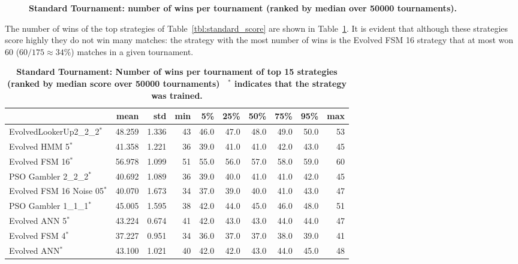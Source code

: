 \documentclass[10pt,letterpaper]{article}
\begin{document}
\begin{figure}[!hbtp]
    \centering
    \caption{\bf Standard Tournament: number of wins per tournament (ranked by
    median over
    50000 tournaments).}
    \label{fig:standard_winplot}
\end{figure}

The number of wins of the top strategies of Table~\ref{tbl:standard_score} are
shown in Table~\ref{tbl:standard_wins}. It is evident that although these
strategies score highly they do not win many matches: the strategy with the most
number of wins is the Evolved FSM 16 strategy that at most won 60
(\(60/175\approx34\%\)) matches in a given tournament.

\begin{table}[!hbtp]
    \caption{\bf Standard Tournament: Number of wins per tournament
        of top 15 strategies (ranked by median score over
        50000 tournaments)
        ~$^{*}$ indicates that the strategy was trained.}
        \label{tbl:standard_wins}
    \centering
    \footnotesize
\begin{tabular}{lrrrrrrrrr}
\toprule
{} &    mean &    std &  min &    5\% &   25\% &   50\% &   75\% &   95\% &  max \\
\midrule
EvolvedLookerUp2\_2\_2$^{*}$    &  48.259 &  1.336 &   43 &  46.0 &  47.0 &  48.0 &  49.0 &  50.0 &   53 \\
Evolved HMM 5$^{*}$           &  41.358 &  1.221 &   36 &  39.0 &  41.0 &  41.0 &  42.0 &  43.0 &   45 \\
Evolved FSM 16$^{*}$          &  56.978 &  1.099 &   51 &  55.0 &  56.0 &  57.0 &  58.0 &  59.0 &   60 \\
PSO Gambler 2\_2\_2$^{*}$       &  40.692 &  1.089 &   36 &  39.0 &  40.0 &  41.0 &  41.0 &  42.0 &   45 \\
Evolved FSM 16 Noise 05$^{*}$ &  40.070 &  1.673 &   34 &  37.0 &  39.0 &  40.0 &  41.0 &  43.0 &   47 \\
PSO Gambler 1\_1\_1$^{*}$       &  45.005 &  1.595 &   38 &  42.0 &  44.0 &  45.0 &  46.0 &  48.0 &   51 \\
Evolved ANN 5$^{*}$           &  43.224 &  0.674 &   41 &  42.0 &  43.0 &  43.0 &  44.0 &  44.0 &   47 \\
Evolved FSM 4$^{*}$           &  37.227 &  0.951 &   34 &  36.0 &  37.0 &  37.0 &  38.0 &  39.0 &   41 \\
Evolved ANN$^{*}$             &  43.100 &  1.021 &   40 &  42.0 &  42.0 &  43.0 &  44.0 &  45.0 &   48 \\

\end{tabular}
\end{table}
\end{document}
